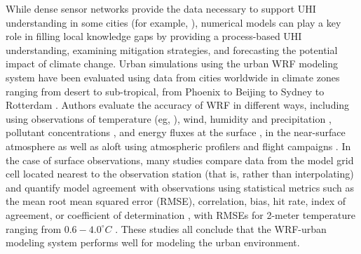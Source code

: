 \documentclass[draft,linenumbers]{agujournal}
\begin{document}
While dense sensor networks provide the data necessary to support UHI understanding in some cities (for example, \cite{scott2017intraurban,scott2017temperature,madisonUHI,minneapolisUHI,tokyoUHI}), numerical models can play a key role in filling local knowledge gaps by providing a process-based UHI understanding, examining mitigation strategies, and forecasting the potential impact of climate change. 
Urban simulations using the urban WRF modeling system \citep{chen2011integrated} have been evaluated using data from cities worldwide in climate zones ranging from desert to sub-tropical, from Phoenix \citep{georgescu2013summer} to Beijing \citep{wang2013modeling} to Sydney \citep{argueso2014temperature} to Rotterdam \citep{theeuwes2014seasonal}. 
Authors evaluate the accuracy of WRF in different ways,
including using observations of temperature (eg, \citet{kusaka2012numerical}), wind, humidity and precipitation \citep{miao2011impacts,chen2011numerical}, pollutant concentrations \citep{brioude2013top}, and energy fluxes at the surface \citep{yang2015enhancing,loridan2012multi}, in the near-surface atmosphere as well as aloft using atmospheric profilers and flight campaigns \citep{li2013development}. 
In the case of surface observations, many studies compare data from the model grid cell located nearest to the observation station (that is, rather than interpolating) and quantify model agreement with observations using statistical metrics such as the mean root mean squared error (RMSE), correlation, bias, hit rate, index of agreement, or coefficient of determination \citep{loridan2010trade,salamanca2011study,lee2011evaluation,chen2011numerical,chen2014wrf,li2013multi}, with RMSEs for 2-meter temperature ranging from $0.6-4.0^\circ C$ \citep{kim2013evaluation}. These studies 
all conclude that the WRF-urban modeling system performs well for modeling the urban environment. %
\end{document}
